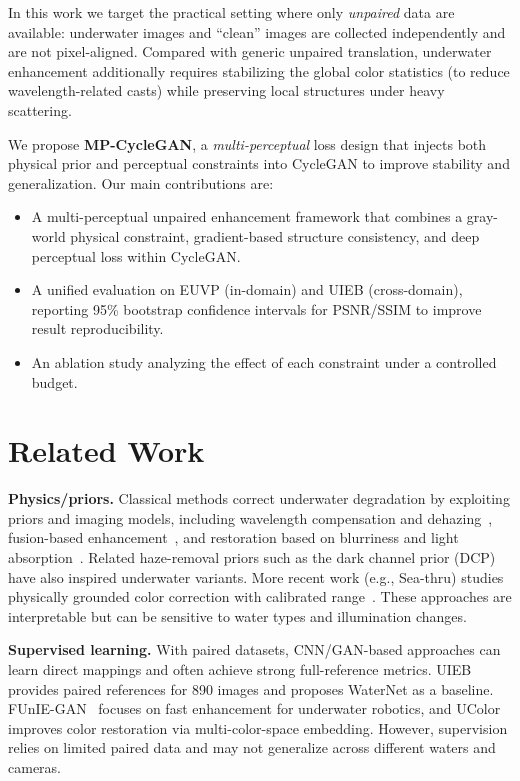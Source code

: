 \documentclass{article}
\begin{document}
In this work we target the practical setting where only \emph{unpaired} data are available: underwater images and ``clean'' images are collected independently and are not pixel-aligned.
Compared with generic unpaired translation, underwater enhancement additionally requires stabilizing the global color statistics (to reduce wavelength-related casts) while preserving local structures under heavy scattering.

We propose \textbf{MP-CycleGAN}, a \textit{multi-perceptual} loss design that injects both physical prior and perceptual constraints into CycleGAN to improve stability and generalization.
Our main contributions are:
\begin{itemize}
  \item A multi-perceptual unpaired enhancement framework that combines a gray-world physical constraint, gradient-based structure consistency, and deep perceptual loss within CycleGAN.
  \item A unified evaluation on EUVP (in-domain) and UIEB (cross-domain), reporting 95\% bootstrap confidence intervals for PSNR/SSIM to improve result reproducibility.
  \item An ablation study analyzing the effect of each constraint under a controlled budget.
\end{itemize}

\section{Related Work}
\textbf{Physics/priors.} Classical methods correct underwater degradation by exploiting priors and imaging models, including wavelength compensation and dehazing~\cite{chiang2012wavelength}, fusion-based enhancement~\cite{ancuti2012fusion}, and restoration based on blurriness and light absorption~\cite{peng2017blurriness}.
Related haze-removal priors such as the dark channel prior (DCP)~\cite{he2009dcp} have also inspired underwater variants.
More recent work (e.g., Sea-thru) studies physically grounded color correction with calibrated range~\cite{akkaynak2019seathru}.
These approaches are interpretable but can be sensitive to water types and illumination changes.

\textbf{Supervised learning.} With paired datasets, CNN/GAN-based approaches can learn direct mappings and often achieve strong full-reference metrics.
UIEB~\cite{li2020uieb} provides paired references for 890 images and proposes WaterNet as a baseline.
FUnIE-GAN~\cite{islam2020funiegan} focuses on fast enhancement for underwater robotics, and UColor~\cite{li2021ucolor} improves color restoration via multi-color-space embedding.
However, supervision relies on limited paired data and may not generalize across different waters and cameras.
\end{document}
